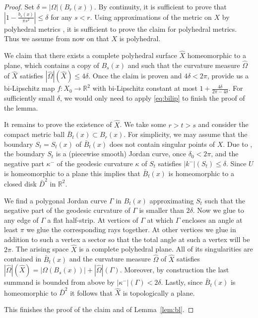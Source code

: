 \documentclass[12pt,leqno,intlimits]{amsart}
\numberwithin{equation}{section}
\theoremstyle{definition}
\theoremstyle{remark}
\newcommand{\lref}[1]{Lemma~\ref{#1}}
\newcommand{\R}{\mathbb{R}}
\begin{document}
\begin{proof}
Set $\delta = |\Omega |( B_{r} (x))$. By continuity, it is sufficient to prove that $|1- \frac {b_s(x)}  {\pi s^2}| \leq \delta $ for any $s<r$.  Using approximations of
the metric on $X$ by polyhedral metrics \cite[Theorem 8.4.3, Theorem 8.1.9]{Reshetnyak-GeomIV},  it is sufficient to prove the claim  for polyhedral metrics. Thus we assume from now on that $X$ is polyhedral.

We claim  that there exists a complete polyhedral surface $\hat X$ homeomorphic to a plane,  which contains a copy of $B_s (x)$ and such that
the curvature measure $\hat \Omega$ of $\hat X$  satisfies $|\hat \Omega | (\hat X) \leq 4\delta$.  Once the claim is proven  and $4\delta < 2\pi$,
\cite{Bonk-Lang} provide us a bi-Lipschitz map $f:X_0\to \R^2$ with bi-Lipschitz constant at most $1+\frac {4\delta} {2\pi -4\delta}$.
For sufficiently small $\delta$, we would only need to apply \eqref{eq:bilip} to finish the proof of the lemma.

It remains to prove the existence of $\hat X$. We take some $r>t>s$ and consider the compact  metric ball $\bar B_t (x) \subset B_r (x)$. For simplicity, we may assume that  the boundary $S_t=S_t (x)$ of
$\bar B_t (x)$ does not contain singular points of $X$. Due to \cite[Theorem 9.1, Theorem 9.3] {Reshetnyak-GeomIV}, the boundary $S_t$ is a (piecewise smooth) Jordan curve, once $\delta _0< 2\pi$, and the negative part $\kappa ^-$ of the geodesic curvature $\kappa$ of $S_t$  satisfies $|k^-| (S_t)  \leq \delta$.  Since $U$ is homeomorphic to a plane this implies that $\bar B_t (x)$ is homeomorphic to a closed disk $\bar D^2$ in $\R^2$.


We find a polygonal Jordan curve $\Gamma$ in $B_t(x)$  approximating $S_t$  such that the negative part of the geodesic curvature of $\Gamma$ is smaller than $2\delta$.
Now we glue to any edge of $\Gamma$ a flat half-strip.   At vertices of $\Gamma$ at which $\Gamma$ encloses an angle at least $\pi$ we glue the corresponding rays together.   At other vertices we glue in addition to such a vertex a sector so that the total angle at such a vertex will be $2\pi$.  The arising space $\hat X$  is a complete polyhedral plane. All of its singularities are contained in $\bar B_t(x)$  and the curvature measure $\hat \Omega$  of $\hat X$ satisfies $|\hat \Omega | ( \hat X) = |\Omega (B_s (x))| + |\hat \Omega | ( \Gamma )$. Moreover, by construction  the last summand is bounded from above by $|\kappa ^-| (\Gamma )<2\delta$.
Lastly, since  $\bar B_t (x)$ is homeomorphic to $\bar D^2$ it follows that $\hat X$ is topologically a plane.

   This finishes the proof of the claim and of \lref{lem:bl}.
\end{proof}
\end{document}
